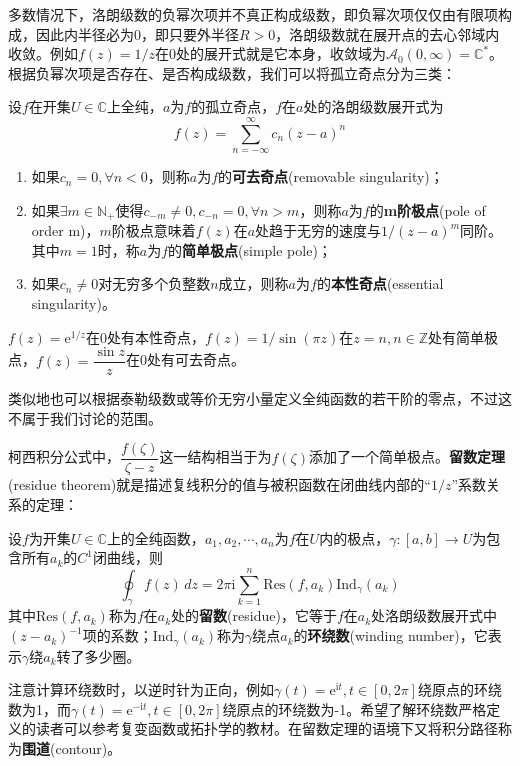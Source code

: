 多数情况下，洛朗级数的负幂次项并不真正构成级数，即负幂次项仅仅由有限项构成，因此内半径必为0，即只要外半径$R>0$，洛朗级数就在展开点的去心邻域内收敛。例如$f(z)=1/z$在0处的展开式就是它本身，收敛域为$\mathcal{A}_0(0,\infty)=\mathbb{C}^*$。根据负幂次项是否存在、是否构成级数，我们可以将孤立奇点分为三类：
\begin{definition}[孤立奇点的分类]\label{def:singular_point}
    设$f$在开集$U\in\mathbb{C}$上全纯，$a$为$f$的孤立奇点，$f$在$a$处的洛朗级数展开式为
    \[f(z)=\sum_{n=-\infty}^{\infty}c_n(z-a)^n\]
    \begin{enumerate}
        \item 如果$c_n=0,\forall n<0$，则称$a$为$f$的\textbf{可去奇点}(removable singularity)；
        \item 如果$\exists m\in\mathbb{N}_+$使得$c_{-m}\neq 0,c_{-n}=0,\forall n>m$，则称$a$为$f$的\textbf{m阶极点}(pole of order m)，$m$阶极点意味着$f(z)$在$a$处趋于无穷的速度与$1/(z-a)^m$同阶。
        其中$m=1$时，称$a$为$f$的\textbf{简单极点}(simple pole)；
        \item 如果$c_n\neq 0$对无穷多个负整数$n$成立，则称$a$为$f$的\textbf{本性奇点}(essential singularity)。
    \end{enumerate}
\end{definition}
\begin{example}
$f(z)=\mathrm{e}^{1/z}$在0处有本性奇点，$f(z)=1/\sin(\pi z)$在$z=n,n\in\mathbb{Z}$处有简单极点，$f(z)=\dfrac{\sin z}{z}$在0处有可去奇点。
\end{example}

类似地也可以根据泰勒级数或等价无穷小量定义全纯函数的若干阶的零点，不过这不属于我们讨论的范围。

柯西积分公式中，$\dfrac{f(\zeta)}{\zeta-z}$这一结构相当于为$f(\zeta)$添加了一个简单极点。\textbf{留数定理}(residue theorem)就是描述复线积分的值与被积函数在闭曲线内部的“$1/z$”系数关系的定理：
\begin{theorem}[留数定理]
    设$f$为开集$U\in\mathbb{C}$上的全纯函数，$a_1,a_2,\cdots,a_n$为$f$在$U$内的极点，$\gamma:[a,b]\to U$为包含所有$a_k$的$C^1$闭曲线，则
    \[\oint_{\gamma}f(z)\,dz=2\pi \mathrm{i}\sum_{k=1}^{n}\mathrm{Res}(f,a_k)\mathrm{Ind}_{\gamma}(a_k)\]
    其中$\mathrm{Res}(f,a_k)$称为$f$在$a_k$处的\textbf{留数}(residue)，它等于$f$在$a_k$处洛朗级数展开式中$(z-a_k)^{-1}$项的系数；$\mathrm{Ind}_{\gamma}(a_k)$称为$\gamma$绕点$a_k$的\textbf{环绕数}(winding number)，它表示$\gamma$绕$a_k$转了多少圈。
\end{theorem}
注意计算环绕数时，以逆时针为正向，例如$\gamma(t)=\mathrm{e}^{\mathrm{i}t},t\in[0,2\pi]$绕原点的环绕数为1，而$\gamma(t)=\mathrm{e}^{-\mathrm{i}t},t\in[0,2\pi]$绕原点的环绕数为-1。希望了解环绕数严格定义的读者可以参考复变函数或拓扑学的教材。在留数定理的语境下又将积分路径称为\textbf{围道}(contour)。

